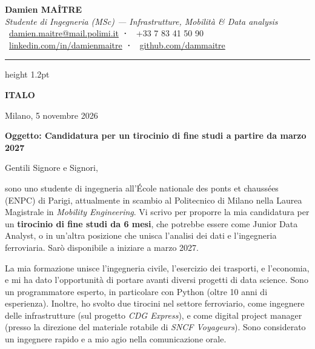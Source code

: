 \documentclass[a4paper,11pt]{extarticle}
\newcommand{\azienda}{ITALO}
\begin{document}
\begin{center}
  {\LARGE\bfseries\color{accent} Damien MAÎTRE}\\[2pt]
  {\normalsize\textit{\textcolor{muted}{Studente di Ingegneria (MSc) — Infrastrutture, Mobilità \& Data analysis}}}\\[4pt]
  \small
  \textcolor{muted}{
    \faEnvelope\ \href{mailto:damien.maitre@mail.polimi.it}{damien.maitre@mail.polimi.it}
    \quad\textbf{·}\quad
    \faPhone\ +33 7 83 41 50 90
    \\[1pt]
    \faLinkedin\ \href{https://linkedin.com/in/damienmaitre}{linkedin.com/in/damienmaitre}
    \quad\textbf{·}\quad
    \faGithub\ \href{https://github.com/dammaitre}{github.com/dammaitre}
  }
\end{center}

\vspace{2pt}
{\color{accent}\hrule height 1.2pt}
\vspace{10pt}

\begin{flushright}
  \textbf{\azienda}\\
\end{flushright}

\vspace{4pt}
Milano, 5 novembre 2026

\vspace{4pt}
{\color{accent}\textbf{Oggetto: Candidatura per un tirocinio di fine studi a partire da marzo 2027}}

\vspace{4pt}
Gentili Signore e Signori,

sono uno studente di ingegneria all'École nationale des ponts et chaussées (ENPC) di Parigi, attualmente in scambio al Politecnico di Milano nella Laurea Magistrale in \textit{Mobility Engineering}. Vi scrivo per proporre la mia candidatura per un \textbf{tirocinio di fine studi da 6 mesi}, che potrebbe essere come Junior Data Analyst, o in un'altra posizione che unisca l'analisi dei dati e l'ingegneria ferroviaria. Sar\`o disponibile a iniziare a marzo 2027.


La mia formazione unisce l'ingegneria civile, l'esercizio dei trasporti, e l'economia, e mi ha dato l'opportunità di portare avanti diversi progetti di data science. Sono un programmatore esperto, in particolare con Python (oltre 10 anni di esperienza). Inoltre, ho svolto due tirocini nel settore ferroviario, come ingegnere delle infrastrutture (sul progetto \textit{CDG Express}), e come digital project manager (presso la direzione del materiale rotabile di \textit{SNCF Voyageurs}). Sono considerato un ingegnere rapido e a mio agio nella comunicazione orale.
\end{document}
